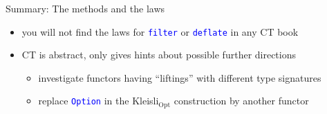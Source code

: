 \documentclass[english]{beamer}
\begin{document}
\begin{frame}{Summary: The methods and the laws}
\begin{itemize}
\begin{itemize}
\item you will not find the laws for \texttt{\textcolor{blue}{\footnotesize{}filter}}
or \texttt{\textcolor{blue}{\footnotesize{}deflate}} in any CT book
\item CT is abstract, only gives hints about possible further directions
\begin{itemize}
\item investigate functors having ``liftings'' with different type signatures
\item replace \texttt{\textcolor{blue}{\footnotesize{}Option}} in the Kleisli$_{\text{Opt}}$
construction by another functor
\end{itemize}
\end{itemize}
\end{itemize}
\end{frame}
\end{document}
